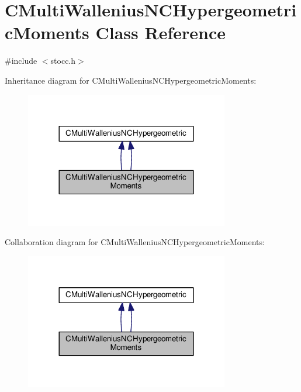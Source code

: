 \section{C\-Multi\-Wallenius\-N\-C\-Hypergeometric\-Moments Class Reference}
\label{class_c_multi_wallenius_n_c_hypergeometric_moments}


{\ttfamily \#include $<$stocc.\-h$>$}



Inheritance diagram for C\-Multi\-Wallenius\-N\-C\-Hypergeometric\-Moments\-:\nopagebreak
\begin{figure}[H]
\begin{center}
\leavevmode
\includegraphics[width=252pt]{class_c_multi_wallenius_n_c_hypergeometric_moments__inherit__graph}
\end{center}
\end{figure}


Collaboration diagram for C\-Multi\-Wallenius\-N\-C\-Hypergeometric\-Moments\-:\nopagebreak
\begin{figure}[H]
\begin{center}
\leavevmode
\includegraphics[width=252pt]{class_c_multi_wallenius_n_c_hypergeometric_moments__coll__graph}
\end{center}
\end{figure}
